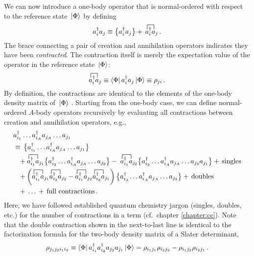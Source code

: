 {We can now introduce a one-body operator that is normal-ordered with respect
to the reference state $\,|{\Phi}\rangle$ by defining
\begin{equation}\label{eq:def_no}
  \aaO_i\aO_j \equiv \nord{\aaO_i\aO_j} +\, \contraction[1.5ex]{}{\aO}{{}^\dag_i}{\aO}\aaO_i\aO_j\,.
\end{equation}
The brace connecting a pair of creation and annihilation operators indicates
they have been \emph{contracted}. The contraction itself is merely the 
expectation value of the operator in the reference state $\,|{\Phi}\rangle$:
\begin{equation}\label{eq:def_particle_contraction}
  \contraction[1.5ex]{}{\aO}{{}^\dag_i}{\aO}\aaO_i\aO_j \equiv \matrixe{\Phi}{\aaO_i\aO_j}{\Phi} \equiv \rho_{ji} \,.
\end{equation}
By definition, the contractions are identical to the elements of the one-body 
density matrix of $\,|{\Phi}\rangle$ \cite{Ring:1980bb}. Starting from the one-body
case, we can define normal-ordered $A$-body operators recursively by evaluating 
all contractions between creation and annihilation operators, e.g., 
\begin{align}\label{eq:def_no_nbody}
   &\aaO_{i_1}\ldots\aaO_{i_A}\aO_{j_A}\ldots\aO_{j_1} \notag\\
    &\equiv\, \nord{\aaO_{i_1}\ldots\aaO_{i_A}\aO_{j_{A}}\ldots\aO_{j_{1}}} \notag\\
    &\hphantom{\equiv}
       + \contraction[1.5ex]{}{\aO}{{}^\dag_{i_1}}{\aO}\aaO_{i_1}\aO_{j_1} 
        \nord{\aaO_{i_2}\ldots\aaO_{i_A}\aO_{j_{A}}\ldots\aO_{j_{2}}} 
      -\; \contraction[1.5ex]{}{\aO}{{}^\dag_{i_1}}{\aO}\aaO_{i_1}\aO_{j_2} 
        \nord{\aaO_{i_2}\ldots\aaO_{i_A}\aO_{j_A}\ldots\aO_{j_{3}}\aO_{j_{1}}}
      + \text{\,singles}\notag\\
    &\hphantom{\equiv}
       + \left(
          \contraction[1.5ex]{}{\aO}{{}^\dag_{i_1}}{\aO}\aaO_{i_1}\aO_{j_1}
          \contraction[1.5ex]{}{\aO}{{}^\dag_{i_1}}{\aO}\aaO_{i_2}\aO_{j_2}
          -
          \contraction[1.5ex]{}{\aO}{{}^\dag_{i_1}}{\aO}\aaO_{i_1}\aO_{j_2}
          \contraction[1.5ex]{}{\aO}{{}^\dag_{i_1}}{\aO}\aaO_{i_2}\aO_{j_1}
        \right) 
        \nord{\aaO_{i_3}\ldots\aaO_{i_A}\aO_{j_A}\ldots\aO_{j_{3}}} + \text{\,doubles} \notag\\
    &\hphantom{\equiv}
  +\,\ldots\,+ \text{\,full contractions}\,.
\end{align}
Here, we have followed established quantum chemistry jargon (singles, doubles, 
etc.) for the number of contractions in a term (cf.~chapter \ref{chapter:cc}).
Note that the double contraction shown in the next-to-last line is identical
to the factorization formula for the two-body density matrix of a Slater 
determinant,
\begin{equation}
  \rho_{j_1j_2i_1i_2}
  \equiv
  \langle{\Phi}|\,{a^\dag_{i_1}a^\dag_{i_2}a_{j_2}a_{j_1}}\,|{\Phi}\rangle
  = \rho_{i_1j_1}\rho_{i_2j_2}- \rho_{i_1j_2}\rho_{i_2j_1}\,.
\end{equation}

}
